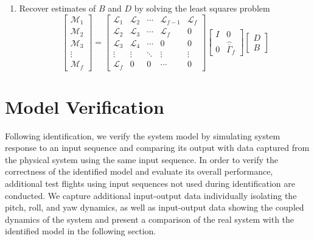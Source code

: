 \begin{table}[!htb]
{\begin{minipage}{5.5in}
\begin{enumerate}
\item Recover estimates of $B$ and $D$ by solving the least squares problem
\begin{equation*}
\begin{bmatrix}\mathcal{M}_1\\ \mathcal{M}_2\\ \mathcal{M}_3\\ \vdots\\ \mathcal{M}_f\end{bmatrix} = 
\begin{bmatrix}
\mathcal{L}_1 & \mathcal{L}_2 & \cdots & \mathcal{L}_{f-1} & \mathcal{L}_f\\
\mathcal{L}_2 & \mathcal{L}_3 & \cdots & \mathcal{L}_{f} & 0\\
\mathcal{L}_3 & \mathcal{L}_4 & \cdots & 0 & 0\\
\vdots & \vdots & \ddots & \vdots & \vdots\\
\mathcal{L}_f & 0 & 0 & \cdots & 0
\end{bmatrix}
\begin{bmatrix}I & 0\\ 0 & \hat{\overline{\Gamma}}_f\end{bmatrix}
\begin{bmatrix}D \\ B\end{bmatrix}
\end{equation*}
\end{enumerate}
\end{minipage}}
\end{table}


\section{Model Verification}
Following identification, we verify the system model by simulating system response to an input sequence and comparing its output with data captured from the physical system using the same input sequence. In order to verify the correctness of the identified model and evaluate its overall performance, additional test flights using input sequences not used during identification are conducted. We capture additional input-output data individually isolating the pitch, roll, and yaw dynamics, as well as input-output data showing the coupled dynamics of the system and present a comparison of the real system with the identified model in the following section.




